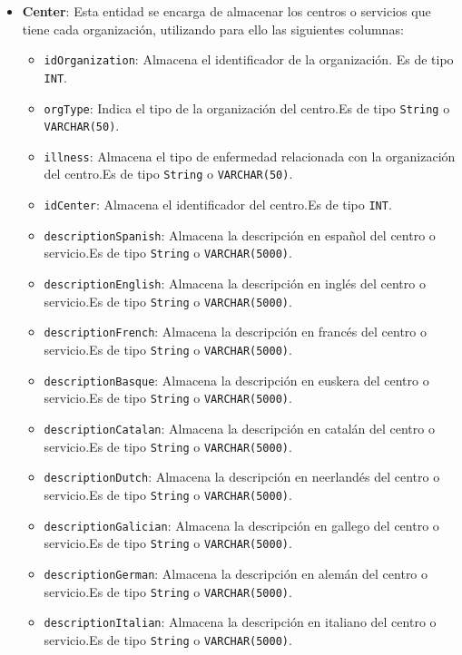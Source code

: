 \begin{itemize}
    \item \textbf{Center}: Esta entidad se encarga de almacenar los centros o servicios que tiene cada organización, utilizando para ello las siguientes columnas:
        \begin{itemize}
        \item \texttt{idOrganization}: Almacena el identificador de la organización. Es de tipo \texttt{INT}.
        \item \texttt{orgType}: Indica el tipo de la organización del centro.Es de tipo \texttt{String} o \texttt{VARCHAR(50)}.
        \item \texttt{illness}: Almacena el tipo de enfermedad relacionada con la organización del centro.Es de tipo \texttt{String} o \texttt{VARCHAR(50)}.
        \item \texttt{idCenter}: Almacena el identificador del centro.Es de tipo \texttt{INT}.
        \item \texttt{descriptionSpanish}: Almacena la descripción en español del centro o servicio.Es de tipo \texttt{String} o \texttt{VARCHAR(5000)}.
        \item \texttt{descriptionEnglish}: Almacena la descripción en inglés del centro o servicio.Es de tipo \texttt{String} o \texttt{VARCHAR(5000)}.
        \item \texttt{descriptionFrench}: Almacena la descripción en francés del centro o servicio.Es de tipo \texttt{String} o \texttt{VARCHAR(5000)}.
        \item \texttt{descriptionBasque}: Almacena la descripción en euskera del centro o servicio.Es de tipo \texttt{String} o \texttt{VARCHAR(5000)}.
        \item \texttt{descriptionCatalan}: Almacena la descripción en catalán del centro o servicio.Es de tipo \texttt{String} o \texttt{VARCHAR(5000)}.
        \item \texttt{descriptionDutch}: Almacena la descripción en neerlandés del centro o servicio.Es de tipo \texttt{String} o \texttt{VARCHAR(5000)}.
        \item \texttt{descriptionGalician}: Almacena la descripción en gallego del centro o servicio.Es de tipo \texttt{String} o \texttt{VARCHAR(5000)}.
        \item \texttt{descriptionGerman}: Almacena la descripción en alemán del centro o servicio.Es de tipo \texttt{String} o \texttt{VARCHAR(5000)}.
        \item \texttt{descriptionItalian}: Almacena la descripción en italiano del centro o servicio.Es de tipo \texttt{String} o \texttt{VARCHAR(5000)}.

\end{itemize}
\end{itemize}
